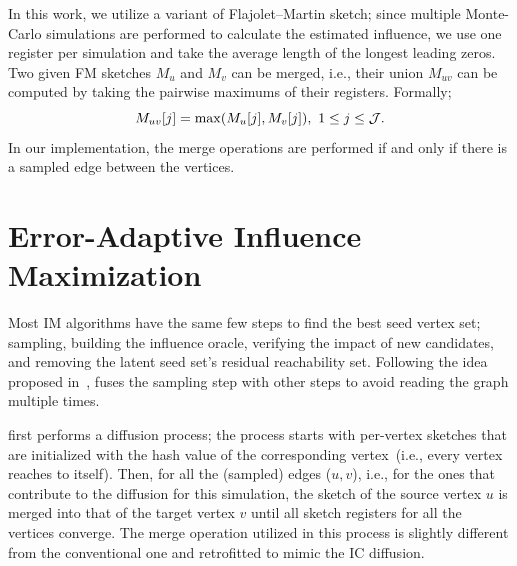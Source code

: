\documentclass[review]{elsarticle}
\newcommand\acro{{\sc{HyperFuseR\xspace}\xspace}\xspace}
\newcommand\kktodo[1]{\textcolor{red}{#1}}
\begin{document}
In this work, we utilize a variant of Flajolet–Martin sketch; since multiple Monte-Carlo simulations are performed to calculate the estimated influence, we use one register per simulation and take the average length of the longest leading zeros. Two given FM sketches $M_u$ and $M_v$ can be merged, i.e., their union $M_{uv}$ can be computed by taking the pairwise maximums of their registers. Formally; 
\begin{equation}
\label{eq:sketch-merge}
    M_{uv}[j] = \max(M_u[j], M_v[j]),~1 \leq j \leq {\cal J}.
\end{equation} 
In our implementation, the merge operations are performed if and only if there is a sampled edge between the vertices. %

\section{Error-Adaptive Influence Maximization}\label{sec:method}

Most IM algorithms have the same few steps to find the best seed vertex set; sampling, building the influence oracle, verifying the impact of new candidates, and removing the latent seed set's residual reachability set. Following the idea proposed in~\cite{infuser}, \acro fuses the sampling step with other steps to avoid reading the graph multiple times. 

\acro first performs a diffusion process; the process starts with per-vertex sketches that are initialized with the hash value of the corresponding vertex~(i.e., every vertex reaches to itself). Then, for all the (sampled) edges ($u, v$), i.e., for the ones that contribute to the diffusion for this simulation, the sketch of the source vertex $u$ is merged into that of the target vertex $v$ until all sketch registers for all the vertices converge. The merge operation utilized in this process is slightly different from the conventional one and retrofitted to mimic the IC diffusion. 
\end{document}
